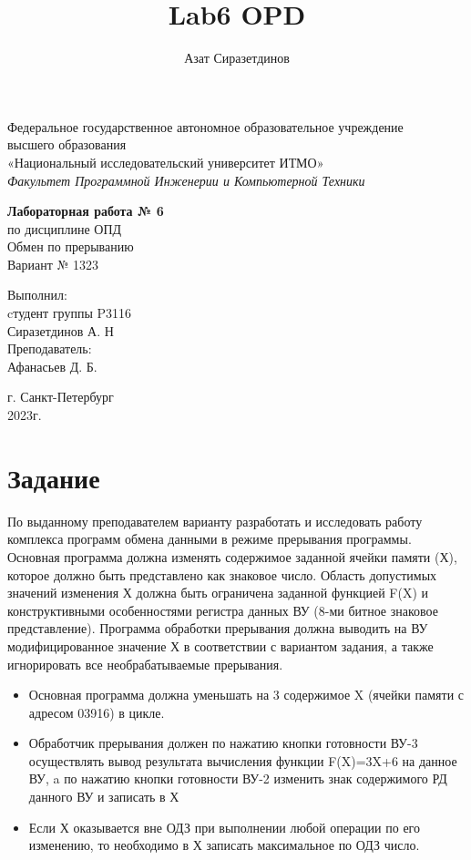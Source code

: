 \documentclass[12pt]{article}
\title{Lab6 OPD}
\author{Азат Сиразетдинов}
\begin{document}
	\thispagestyle{empty}
	\begin{center}
		Федеральное государственное автономное образовательное учреждение\\ 
		высшего образования\\
		«Национальный исследовательский университет ИТМО»\\
		\textit{Факультет Программной Инженерии и Компьютерной Техники}\\
	\end{center}
	\vspace{2cm}
	\begin{center}
		\large
		\textbf{Лабораторная работа № 6}\\
		по дисциплине ОПД\\
		Обмен по прерыванию\\
		Вариант № 1323
	\end{center}
	\vspace{7cm}
	\begin{flushright}
		Выполнил:\\
		cтудент  группы P3116\\
		Сиразетдинов А. Н\\
		Преподаватель: \\
		Афанасьев Д. Б.\\
	\end{flushright}
	\vspace{6cm}
	\begin{center}
		г. Санкт-Петербург\\
		2023г.
	\end{center}
	\newpage
	
	\tableofcontents
	
	\newpage
	\section{Задание}
	
	По выданному преподавателем варианту разработать и исследовать работу комплекса программ обмена данными в режиме прерывания программы. Основная программа должна изменять содержимое заданной ячейки памяти (Х), которое должно быть представлено как знаковое число. Область допустимых значений изменения Х должна быть ограничена заданной функцией F(X) и конструктивными особенностями регистра данных ВУ (8-ми битное знаковое представление). Программа обработки прерывания должна выводить на ВУ модифицированное значение Х в соответствии с вариантом задания, а также игнорировать все необрабатываемые прерывания.
	\begin{itemize}
		\item Основная программа должна уменьшать на 3 содержимое X (ячейки памяти с адресом 03916) в цикле.
		\item Обработчик прерывания должен по нажатию кнопки готовности ВУ-3 осуществлять вывод результата вычисления функции F(X)=3X+6 на данное ВУ, a по нажатию кнопки готовности ВУ-2 изменить знак содержимого РД данного ВУ и записать в Х
		\item Если Х оказывается вне ОДЗ при выполнении любой операции по его изменению, то необходимо в Х записать максимальное по ОДЗ число.
	\end{itemize}
	\newpage
	
\end{document}
